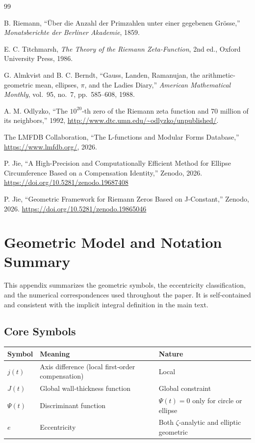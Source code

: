 \documentclass[12pt,a4paper]{article}
\begin{document}
\begin{thebibliography}{99}\label{sec:refs}

 B. Riemann, ``\"{U}ber die Anzahl der Primzahlen unter einer gegebenen Gr\"{o}sse,'' \textit{Monatsberichte der Berliner Akademie}, 1859.

 E. C. Titchmarsh, \textit{The Theory of the Riemann Zeta-Function}, 2nd ed., Oxford University Press, 1986.

 G. Almkvist and B. C. Berndt, ``Gauss, Landen, Ramanujan, the arithmetic-geometric mean, ellipses, $\pi$, and the Ladies Diary,'' \textit{American Mathematical Monthly}, vol.~95, no.~7, pp.~585--608, 1988.

 A. M. Odlyzko, ``The $10^{20}$-th zero of the Riemann zeta function and 70 million of its neighbors,'' 1992, \url{http://www.dtc.umn.edu/~odlyzko/unpublished/}.

 The LMFDB Collaboration, ``The L-functions and Modular Forms Database,'' \url{https://www.lmfdb.org/}, 2026.

 P. Jie, ``A High-Precision and Computationally Efficient Method for Ellipse Circumference Based on a Compensation Identity,'' Zenodo, 2026. \url{https://doi.org/10.5281/zenodo.19687408}

 P. Jie, ``Geometric Framework for Riemann Zeros Based on J-Constant,'' Zenodo, 2026. \url{https://doi.org/10.5281/zenodo.19865046}

\end{thebibliography}

\appendix
\section{Geometric Model and Notation Summary}\label{app:A}

\footnotesize %

This appendix summarizes the geometric symbols, the eccentricity classification, and the numerical correspondences used throughout the paper. It is self‑contained and consistent with the implicit integral definition in the main text.

\subsection{Core Symbols}\label{app:A1}

\begin{tabularx}{\textwidth}{lXl}
\toprule
Symbol & Meaning & Nature \\
\midrule
$j(t)$ & Axis difference (local first‑order compensation) & Local \\
$J(t)$ & Global wall‑thickness function & Global constraint \\
$\Psi(t)$ & Discriminant function & $\Psi(t)=0$ only for circle or ellipse \\
$e$ & Eccentricity & Both $\zeta$‑analytic and elliptic geometric \\
\bottomrule
\end{tabularx}
\end{document}
